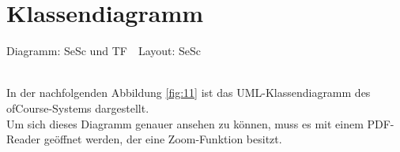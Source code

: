 	\section{Klassendiagramm}
	\begin{tiny}
		Diagramm: SeSc und TF\ \ Layout: SeSc\\
	\end{tiny}\\
	In der nachfolgenden Abbildung \ref{fig:11} ist das UML-Klassendiagramm des ofCourse-Systems dargestellt.\\
	Um sich dieses Diagramm genauer ansehen zu können, muss es mit einem PDF-Reader
	geöffnet werden, der eine Zoom-Funktion besitzt.